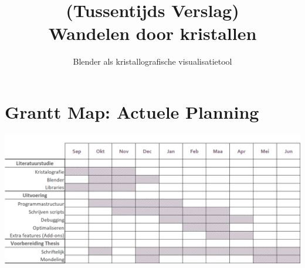 \documentclass[11pt,a4paper]{report}
\title{(Tussentijds Verslag)\\Wandelen door kristallen}
\subtitle{Blender als kristallografische visualisatietool}
\begin{document}
\preface




\nocite{*}



\appendix



\chapter*{Grantt Map: Actuele Planning}
\includegraphics[width=\textwidth,height=\textheight,keepaspectratio]{Grantt.png}

\end{document}
